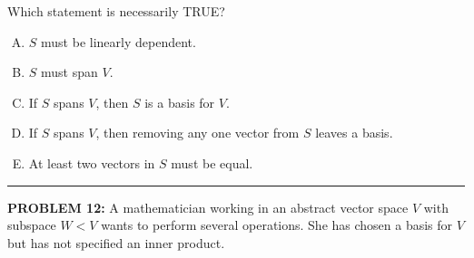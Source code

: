 \documentclass[12pt]{amsart}
\newcommand{\divider}{
  \vspace{-1em} %
  \noindent
  \raisebox{-0.15ex}{\textbullet}%
  \hspace{0.5em}%
  \rule[0.5ex]{0.95\textwidth}{1.0pt}%
  \hspace{0.5em}%
  \raisebox{-0.15ex}{\textbullet}%
  \vspace{0em} %
}
\begin{document}
{Which statement is necessarily TRUE?

\begin{enumerate}[(A)]
\item $S$ must be linearly dependent.

\item $S$ must span $V$.

\item If $S$ spans $V$, then $S$ is a basis for $V$.

\item If $S$ spans $V$, then removing any one vector from $S$ leaves a basis.

\item At least two vectors in $S$ must be equal.
\end{enumerate}

%
%
%
%
%

\divider


{\bf PROBLEM 12:}
% 
A mathematician working in an abstract vector space $V$ with subspace $W<V$ wants to perform several operations. 
She has chosen a basis for $V$ but has not specified an inner product.

}
\end{document}
